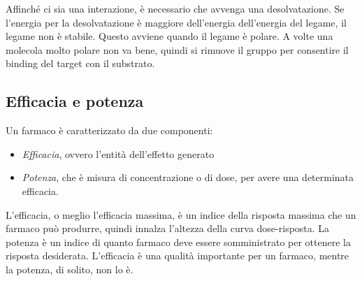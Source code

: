 Affinché ci sia una interazione, è necessario che avvenga una
desolvatazione. Se l'energia per la desolvatazione è maggiore
dell'energia dell'energia del legame, il legame non è stabile. Questo
avviene quando il legame è polare.
A volte una molecola molto polare non va bene, quindi si rimuove il gruppo per consentire
il binding del target con il substrato.


\subsection{Efficacia e potenza}

Un farmaco è caratterizzato da due componenti:
\begin{itemize}
\item
  \emph{Efficacia}, ovvero l'entità dell'effetto generato
\item
  \emph{Potenza}, che è misura di concentrazione o di dose, per avere una determinata efficacia.
\end{itemize}

L'efficacia, o meglio l'efficacia massima, è un indice della risposta massima che un farmaco può produrre, quindi innalza l'altezza della curva dose-risposta.
La potenza è un indice di quanto farmaco deve essere somministrato per ottenere la risposta desiderata.
L'efficacia è una qualità importante per un farmaco, mentre la potenza, di solito, non lo è.



